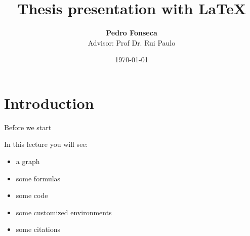 


\title[Thesis presentation with Latex]{Thesis presentation with \LaTeX}

\author[Pedro Fonseca]{\textbf {Pedro Fonseca} \\ \footnotesize Advisor: Prof Dr. Rui Paulo}

\date{\today}








\section{Introduction}


\begin{frame}{Before we start}

In this lecture you will see:

\begin{itemize}

\item a graph
\item some formulas
\item some code
\item some customized environments
\item some citations \citep{kass1995}

\end{itemize}

\end{frame}

